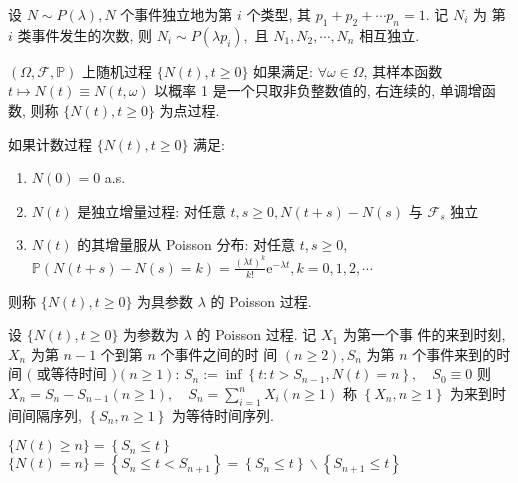 \documentclass[10pt]{yerbaformat}
\begin{document}
\begin{theorem}
    设 $N \sim P(\lambda), N$ 个事件独立地为第 $i$ 个类型, 其 $p_{1}+p_{2}+\cdots p_{n}=1 .$ 记 $N_{i}$ 为 第 $i$ 类事件发生的次数, 则 $N_{i} \sim P\left(\lambda p_{i}\right),$ 且 $N_{1}, N_{2}, \cdots, N_{n}$ 相互独立.
\end{theorem}

\begin{definition}[点过程]
    $(\Omega, \mathcal{F}, \mathbb{P})$ 上随机过程 $\{N(t), t \geq 0\}$ 如果满足:
    $\forall \omega \in \Omega$, 其样本函数 $t \mapsto N(t) \equiv N(t, \omega)$
    以概率 1 是一个只取非负整数值的, 右连续的, 单调增函数, 则称 $\{N(t), t \geq 0\}$ 为点过程.
\end{definition}

\begin{definition}
    如果计数过程 $\{N(t), t \geq 0\}$ 满足:
    \begin{enumerate}
        \item $N(0)=0$ a.s.
        \item $N(t)$ 是独立增量过程: 对任意 $t, s \geq 0, N(t+s)-N(s)$ 与 $\mathcal{F}_{s}$ 独立
        \item $N(t)$ 的其增量服从 Poisson 分布: 对任意 $t, s \geq 0$, $\mathbb{P}(N(t+s)-N(s)=k)=\frac{(\lambda t)^{k}}{k !} \mathrm{e}^{-\lambda t}, k=0,1,2, \cdots$
    \end{enumerate}
    则称 $\{N(t), t \geq 0\}$ 为具参数 $\lambda$ 的 Poisson 过程.
\end{definition}

\begin{definition}
    设 $\{N(t), t \geq 0\}$ 为参数为 $\lambda$ 的 Poisson 过程. 记 $X_{1}$ 为第一个事 件的来到时刻, $X_{n}$ 为第 $n-1$ 个到第 $n$ 个事件之间的时 间 $(n \geq 2), S_{n}$ 为第 $n$ 个事件来到的时间 $($ 或等待时间 $)(n \geq 1)$: $S_{n}:=\inf \left\{t: t>S_{n-1}, N(t)=n\right\}, \quad S_{0} \equiv 0$ 则 $X_{n}=S_{n}-S_{n-1}(n \geq 1), \quad S_{n}=\sum_{i=1}^{n} X_{i}(n \geq 1)$ 称 $\left\{X_{n}, n \geq 1\right\}$ 为来到时间间隔序列, $\left\{S_{n}, n \geq 1\right\}$ 为等待时间序列.
\end{definition}

\begin{lemma}
    $\{N(t) \geq n\}=\left\{S_{n} \leq t\right\}$ \\
    $\{N(t)=n\}=\left\{S_{n} \leq t<S_{n+1}\right\}=\left\{S_{n} \leq t\right\} \backslash\left\{S_{n+1} \leq t\right\}$
\end{lemma}
\end{document}
